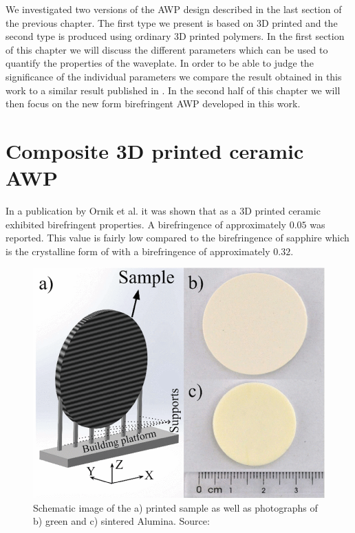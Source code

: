 We investigated two versions of the AWP design described in the last section of the previous chapter. The first type we present is based on 3D printed  and the second type is produced using ordinary 3D printed polymers. In the first section of this chapter we will discuss the different parameters which can be used to quantify the properties of the waveplate. In order to be able to judge the significance of the individual parameters we compare the result obtained in this work to a similar result published in \cite{Masson2006}. In the second half of this chapter we will then focus on the new form birefringent AWP developed in this work.

\section{Composite 3D printed ceramic AWP}
In a publication by Ornik et al. it was shown that  as a 3D printed ceramic exhibited birefringent properties. A birefringence of approximately $0.05$ was reported. This value is fairly low compared to the birefringence of sapphire which is the crystalline form of  with a birefringence of approximately $0.32$. 

\begin{figure}[ht]
    \centering
    \includegraphics[scale=0.4]{images/5_chapter05/ornikabclarge.png}
    \caption{Schematic image of the a) printed sample as well as photographs of b) green and c) sintered Alumina. Source: \cite{Ornik2021}}
    \label{fig:ornik1abc}
\end{figure}

